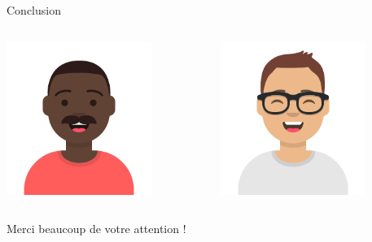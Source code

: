 \documentclass{beamer}
\begin{document}
\begin{frame}{Conclusion}
    \begin{columns}[T]
    \begin{column}[c]{5cm}
        \includegraphics[height=5cm]{Images/avatar_david.png}
    \end{column}
    \begin{column}[c]{5cm}
        \includegraphics[height=5cm]{Images/avatar_alexandre.png}
    \end{column}
    \end{columns}
    \begin{center}Merci beaucoup de votre attention !\end{center}
\end{frame}
\end{document}
